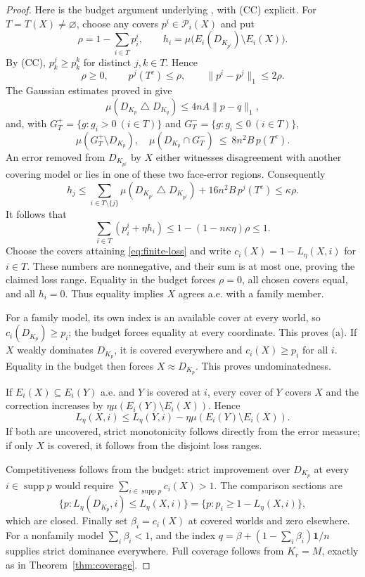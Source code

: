 \documentclass[11pt]{article}
\theoremstyle{remark}
\newcommand{\one}{\mathbf 1}
\newcommand{\supp}{\operatorname{supp}}
\newcommand{\sd}{\mathbin{\triangle}}
\begin{document}
\begin{proof}
Here is the budget argument underlying \cite{LR}, with (CC) explicit.
For $T=T(X)\ne\varnothing$, choose any covers $p^i\in\mathcal P_i(X)$ and put
\[
 \rho=1-\sum_{i\in T}p^i_i,
 \qquad h_i=\mu\big(E_i(D_{K_{p^i}})\setminus E_i(X)\big).
\]
By (CC), $p^j_k\ge p^k_k$ for distinct $j,k\in T$. Hence
\[
 \rho\ge0,\qquad p^j(T^c)\le\rho,
 \qquad\|p^i-p^j\|_1\le2\rho.
\]
The Gaussian estimates proved in \cite{LR} give
\[
 \mu(D_{K_p}\sd D_{K_q})\le4nA\|p-q\|_1,
\]
and, with $G_T^+=\{g:g_i>0\ (i\in T)\}$ and
$G_T^-=\{g:g_i\le0\ (i\in T)\}$,
\[
 \mu(G_T^+\setminus D_{K_p}),\quad
 \mu(D_{K_p}\cap G_T^-)
 \ \le\ 8n^2B\,p(T^c).
\]
An error removed from $D_{K_{p^j}}$ by $X$ either witnesses disagreement
with another covering model or lies in one of these two face-error regions.
Consequently
\[
 h_j\le\sum_{i\in T\setminus\{j\}}
       \mu(D_{K_{p^i}}\sd D_{K_{p^j}})
       +16n^2B\,p^j(T^c)
 \le\kappa\rho.
\]
It follows that
\[
 \sum_{i\in T}(p^i_i+\eta h_i)
 \le1-(1-n\kappa\eta)\rho\le1.
 \tag{11}\label{eq:numerical-budget}
\]
Choose the covers attaining \eqref{eq:finite-loss} and write
$c_i(X)=1-L_\eta(X,i)$ for $i\in T$. These numbers are nonnegative, and
their sum is at most one, proving the claimed loss range. Equality in the
budget forces $\rho=0$, all chosen covers equal, and all $h_i=0$.
Thus equality implies $X$ agrees a.e. with a family member.

For a family model, its own index is an available cover at every world,
so $c_i(D_{K_p})\ge p_i$; the budget forces equality at every coordinate.
This proves (a). If $X$ weakly dominates $D_{K_p}$, it is covered everywhere
and $c_i(X)\ge p_i$ for all $i$. Equality in the budget then forces
$X\approx D_{K_p}$. This proves undominatedness.

If $E_i(X)\subseteq E_i(Y)$ a.e. and $Y$ is covered at $i$, every cover of
$Y$ covers $X$ and the correction increases by
$\eta\mu(E_i(Y)\setminus E_i(X))$. Hence
\[
 L_\eta(X,i)\le L_\eta(Y,i)
       -\eta\mu(E_i(Y)\setminus E_i(X)).
\]
If both are uncovered, strict monotonicity follows directly from the error
measure; if only $X$ is covered, it follows from the disjoint loss ranges.

Competitiveness follows from the budget: strict improvement over $D_{K_p}$
at every $i\in\supp p$ would require $\sum_{i\in\supp p}c_i(X)>1$.
The comparison sections are
\[
 \{p:L_\eta(D_{K_p},i)\le L_\eta(X,i)\}
 =\{p:p_i\ge1-L_\eta(X,i)\},
\]
which are closed. Finally set $\beta_i=c_i(X)$ at covered worlds and zero
elsewhere. For a nonfamily model $\sum_i\beta_i<1$, and the index
$q=\beta+(1-\sum_i\beta_i)\one/n$ supplies strict dominance everywhere.
Full coverage follows from $K_r=M$, exactly as in
Theorem~\ref{thm:coverage}.
\end{proof}
\end{document}
